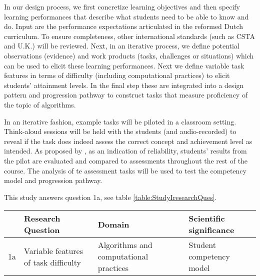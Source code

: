In our design process, we first concretize learning objectives and then specify learning performances that describe what students need to be able to know and do. Input are the performance expectations articulated in the reformed Dutch curriculum. To ensure completeness, other international standards (such as CSTA and U.K.) will be reviewed. Next, in an iterative process, we define potential observations (evidence) and work products (tasks, challenges or situations) which can be used to elicit these learning performances. Next we define variable task features in terms of difficulty (including computational practices) to elicit students' attainment levels. In the final step these are integrated into a design pattern and progression pathway to construct tasks that measure proficiency of the topic of algorithms.

In an iterative fashion, example tasks will be piloted in a classroom setting. Think-aloud sessions will be held with the students (and audio-recorded) to reveal if the task does indeed assess the correct concept and achievement level as intended. As proposed by , as an indication of reliability, students' results from the pilot are evaluated and compared to assessments throughout the rest of the course. The analysis of te assessment tasks will be used to test the competency model and progression pathway.






This study answers question 1a, see table \ref{table:StudyIresearchQues}.
\begin{table*}
  \centering
\begin{tabular}{|c|p{70mm}|l|p{50mm}|}
   \hline
    &\textbf{Research Question} & \textbf{Domain} & \textbf{Scientific significance}\\
  \hline

  1a & Variable features of task difficulty & Algorithms and computational practices & Student competency model \\
  \hline
\end{tabular}
\caption{Overview study II.}\label{table:StudyIresearchQues}
\end{table*}



